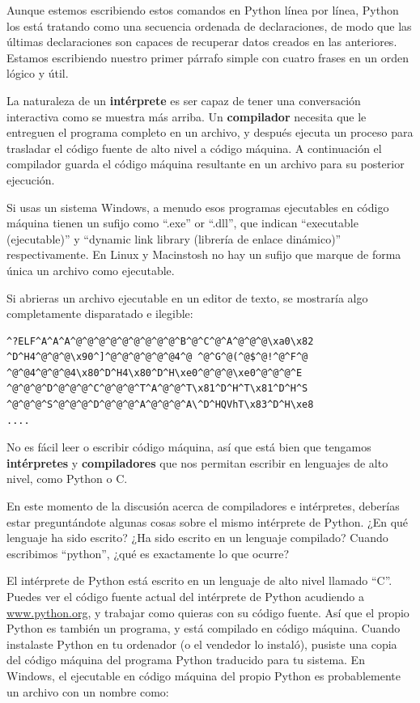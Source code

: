 Aunque estemos escribiendo estos comandos en Python línea por línea, Python
los está tratando como una secuencia ordenada de declaraciones, de modo
que las últimas declaraciones son capaces de recuperar datos creados en las
anteriores. Estamos escribiendo nuestro primer párrafo simple con cuatro frases
en un orden lógico y útil.

La naturaleza de un {\bf intérprete} es ser capaz de tener una conversación interactiva como se muestra más arriba. Un {\bf compilador} necesita que le entreguen el programa
completo en un archivo, y después
ejecuta un proceso para trasladar el código fuente de alto nivel a código máquina.
A continuación el compilador guarda el código máquina resultante en un archivo para su
posterior ejecución. 

Si usas un sistema Windows, a menudo esos programas ejecutables en código máquina tienen un sufijo como ``.exe'' or ``.dll'', que indican ``executable (ejecutable)'' y ``dynamic
link library (librería de enlace dinámico)'' respectivamente. En Linux y Macinstosh
no hay un sufijo que marque de forma única un archivo como ejecutable.

Si abrieras un archivo ejecutable en un editor de texto, se mostraría algo
completamente disparatado e ilegible:

\beforeverb
\begin{verbatim}
^?ELF^A^A^A^@^@^@^@^@^@^@^@^@^B^@^C^@^A^@^@^@\xa0\x82
^D^H4^@^@^@\x90^]^@^@^@^@^@^@4^@ ^@^G^@(^@$^@!^@^F^@
^@^@4^@^@^@4\x80^D^H4\x80^D^H\xe0^@^@^@\xe0^@^@^@^E
^@^@^@^D^@^@^@^C^@^@^@^T^A^@^@^T\x81^D^H^T\x81^D^H^S
^@^@^@^S^@^@^@^D^@^@^@^A^@^@^@^A\^D^HQVhT\x83^D^H\xe8
....
\end{verbatim}
\afterverb
%
No es fácil leer o escribir código máquina, así que está bien que tengamos
{\bf intérpretes} y {\bf compiladores} que nos permitan escribir en lenguajes
de alto nivel, como Python o C.

En este momento de la discusión acerca de compiladores e intérpretes, deberías
estar preguntándote algunas cosas sobre el mismo intérprete de Python. ¿En qué
lenguaje ha sido escrito? ¿Ha sido escrito en un lenguaje compilado? Cuando escribimos ``python'', ¿qué es exactamente lo que ocurre?

El intérprete de Python está escrito en un lenguaje de alto nivel llamado ``C''.
Puedes ver el código fuente actual del intérprete de Python acudiendo a
\url{www.python.org}, y trabajar como quieras con su código fuente.
Así que el propio Python es también un programa, y está compilado en código máquina.
Cuando instalaste Python en tu ordenador (o el vendedor lo instaló),
pusiste una copia del código máquina del programa Python traducido para tu sistema.
En Windows, el ejecutable en código máquina del propio Python es probablemente
un archivo con un nombre como:

